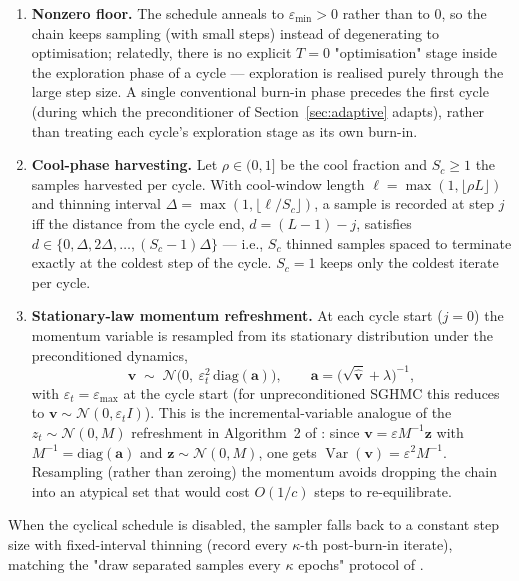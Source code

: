 \documentclass[11pt]{article}
\newcommand{\vv}{\mathbf{v}}
\newcommand{\N}{\mathcal{N}}
\newcommand{\vhat}{\hat{\mathbf{v}}}
\begin{document}
\begin{enumerate}
  \item \textbf{Nonzero floor.}  The schedule anneals to
  $\varepsilon_{\min} > 0$ rather than to $0$, so the chain keeps sampling
  (with small steps) instead of degenerating to optimisation; relatedly,
  there is no explicit $T=0$ "optimisation" stage inside the exploration
  phase of a cycle --- exploration is realised purely through the large step
  size.  A single conventional burn-in phase precedes the first cycle (during
  which the preconditioner of Section~\ref{sec:adaptive} adapts), rather than
  treating each cycle's exploration stage as its own burn-in.
  \item \textbf{Cool-phase harvesting.}  Let $\rho\in(0,1]$ be the cool
  fraction and $S_c \ge 1$ the samples harvested per cycle.  With cool-window
  length $\ell = \max(1, \lfloor \rho L\rfloor)$ and thinning interval
  $\Delta = \max(1, \lfloor \ell / S_c\rfloor)$, a sample is recorded at step
  $j$ iff the distance from the cycle end, $d = (L-1) - j$, satisfies
  $d \in \{0, \Delta, 2\Delta, \dots, (S_c - 1)\Delta\}$ --- i.e., $S_c$
  thinned samples spaced to terminate exactly at the coldest step of the
  cycle.  $S_c = 1$ keeps only the coldest iterate per cycle.
  \item \textbf{Stationary-law momentum refreshment.}  At each cycle start
  ($j=0$) the momentum variable is resampled from its stationary distribution
  under the preconditioned dynamics,
  \begin{equation}
    \vv \;\sim\; \N\!\bigl(0,\ \varepsilon_t^{2}\,
      \mathrm{diag}(\mathbf{a})\bigr),
    \qquad
    \mathbf{a} = \bigl(\sqrt{\vhat}+\lambda\bigr)^{-1},
    \label{eq:refresh}
  \end{equation}
  with $\varepsilon_t = \varepsilon_{\max}$ at the cycle start (for
  unpreconditioned SGHMC this reduces to
  $\vv \sim \N(0, \varepsilon_t I)$).  This is the incremental-variable
  analogue of the $z_t \sim \N(0,M)$ refreshment in Algorithm~2 of
  \cite{wu2025}: since $\vv = \varepsilon M^{-1} \mathbf{z}$ with
  $M^{-1} = \mathrm{diag}(\mathbf a)$ and $\mathbf z\sim\N(0,M)$, one gets
  $\operatorname{Var}(\vv) = \varepsilon^2 M^{-1}$.  Resampling (rather than
  zeroing) the momentum avoids dropping the chain into an atypical set that
  would cost $O(1/c)$ steps to re-equilibrate.
\end{enumerate}
When the cyclical schedule is disabled, the sampler falls back to a constant
step size with fixed-interval thinning (record every $\kappa$-th post-burn-in
iterate), matching the "draw separated samples every $\kappa$ epochs"
protocol of \cite{wu2025}.
\end{document}
